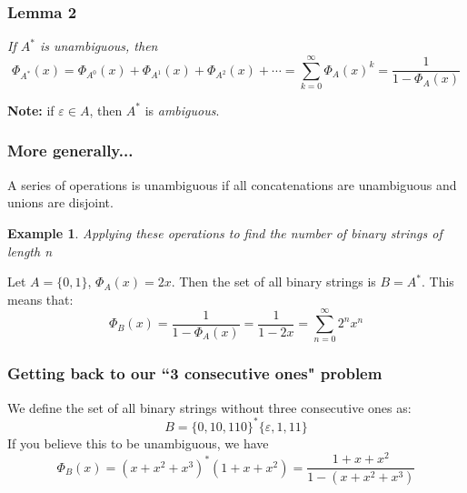 \documentclass{report}
\newtheorem{ex}{Example}[section]
\begin{document}
\subsubsection{Lemma 2}
\begin{center}
\textit{If $A^*$ is unambiguous, then} $$\Phi_{A^*}(x) = \Phi_{A^0}(x) + \Phi_{A^1}(x) + \Phi_{A^2}(x) + \cdots = \sum_{k = 0}^\infty\Phi_A(x)^k = \frac{1}{1-\Phi_A(x)}$$
\end{center}
\textbf{Note:} if $\varepsilon \in A$, then $A^*$ is \textit{ambiguous}.
\subsubsection{More generally...}
A series of operations is unambiguous if all concatenations are unambiguous and unions are disjoint.
\begin{ex}
Applying these operations to find the number of binary strings of length n
\end{ex}
Let $A = \{0, 1\}$, $\Phi_A(x) = 2x$. Then the set of all binary strings is $B = A^*$. This means that:
$$\Phi_B(x) = \frac{1}{1-\Phi_A(x)} = \frac{1}{1-2x} = \sum_{n = 0}^\infty 2^nx^n$$
\subsubsection{Getting back to our ``3 consecutive ones" problem}
We define the set of all binary strings without three consecutive ones as:
$$B = \{0, 10, 110\}^*\{\varepsilon, 1, 11\}$$
If you believe this to be unambiguous, we have
$$\Phi_B(x) = (x + x^2 + x^3)^*(1 + x + x^2) = \frac{1 + x + x^2}{1 - (x + x^2 + x^3)}$$
\end{document}
